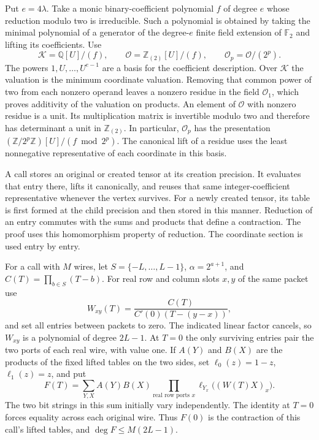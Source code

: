 \documentclass[
  11pt,
]{article}
\begin{document}
Put \(e=4\lambda\). Take a monic binary-coefficient polynomial \(f\)
of degree \(e\) whose reduction modulo two is irreducible. Such a
polynomial is obtained by taking the minimal polynomial of a
generator of the degree-\(e\) finite field extension of
\(\mathbb F_2\) and lifting its coefficients. Use
\[
 \mathcal K=\mathbb Q[U]/(f),\qquad
 \mathcal O=\mathbb Z_{(2)}[U]/(f),\qquad
 \mathcal O_p=\mathcal O/(2^p).
\]
The powers \(1,U,\ldots,U^{e-1}\) are a basis for the coefficient
description. Over \(\mathcal K\) the valuation is the minimum
coordinate valuation. Removing that common power of two from
each nonzero operand leaves a nonzero residue in the field
\(\mathcal O_1\), which proves additivity of the valuation on
products. An element of \(\mathcal O\) with nonzero residue is a
unit. Its multiplication matrix is invertible modulo two and
therefore has determinant a unit in \(\mathbb Z_{(2)}\).
In particular,
\(\mathcal O_p\) has the presentation
\((\mathbb Z/2^p\mathbb Z)[U]/(f\bmod 2^p)\).
The canonical lift of a residue uses the least nonnegative
representative of each coordinate in this basis.

A call stores an original or created tensor at its creation
precision. It evaluates that entry there, lifts it canonically,
and reuses that same integer-coefficient representative whenever
the vertex survives. For a newly created tensor, its table is
first formed at the child precision and then stored in this
manner. Reduction of an entry commutes with the sums and products
that define a contraction. The proof uses this homomorphism
property of reduction. The coordinate section is used entry by
entry.

For a call with \(M\) wires, let \(S=\{-L,\ldots,L-1\}\),
\(\alpha=2^{a+1}\), and \(C(T)=\prod_{b\in S}(T-b)\).
For real row and column slots \(x,y\) of the same packet use
\[
 W_{xy}(T)=\frac{C(T)}{C'(0)(T-(y-x))},
\]
and set all entries between packets to zero. The indicated
linear factor cancels, so \(W_{xy}\) is a polynomial of degree
\(2L-1\). At \(T=0\) the only surviving entries pair the two
ports of each real wire, with value one. If \(A(Y)\) and \(B(X)\)
are the products of the fixed lifted tables on the two sides,
set \(\ell_0(z)=1-z\), \(\ell_1(z)=z\), and put
\[
 F(T)=\sum_{Y,X}A(Y)B(X)\prod_{\text{real row ports }x}
                      \ell_{Y_x}\bigl((W(T)X)_x\bigr).
\]
The two bit strings in this sum initially vary independently.
The identity at \(T=0\) forces equality across each original
wire. Thus \(F(0)\) is the contraction of this call's lifted
tables, and \(\deg F\le M(2L-1)\).
\end{document}
